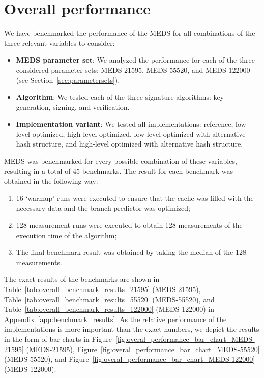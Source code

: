 \documentclass[11pt,a4paper]{report}
\theoremstyle{definition}
\begin{document}
\section{Overall performance}
\label{sec:overallperformance}
We have benchmarked the performance of the MEDS for all combinations of the three relevant variables to consider:
\begin{itemize}
  \item \textbf{MEDS parameter set}: We analyzed the performance for each of the three considered parameter sets: MEDS-21595, MEDS-55520, and MEDS-122000 (see Section~\ref{sec:parametersets}).
  \item \textbf{Algorithm}: We tested each of the three signature algorithms: key generation, signing, and verification.
  \item \textbf{Implementation variant}: We tested all implementations: reference, low-level optimized, high-level optimized, low-level optimized with alternative hash structure, and high-level optimized with alternative hash structure.
\end{itemize}
MEDS was benchmarked for every possible combination of these variables, resulting in a total of 45 benchmarks. The result for each benchmark was obtained in the following way:
\begin{enumerate}
  \item 16 `warmup' runs were executed to ensure that the cache was filled with the necessary data and the branch predictor was optimized;
  \item 128 measurement runs were executed to obtain 128 measurements of the execution time of the algorithm;
  \item The final benchmark result was obtained by taking the median of the 128 measurements.
\end{enumerate}

The exact results of the benchmarks are shown in Table~\ref{tab:overall_benchmark_results_21595} (MEDS-21595), Table~\ref{tab:overall_benchmark_results_55520} (MEDS-55520), and Table~\ref{tab:overall_benchmark_results_122000} (MEDS-122000) in Appendix~\ref{app:benchmark_results}. As the relative performance of the implementations is more important than the exact numbers, we depict the results in the form of bar charts in Figure~\ref{fig:overal_performance_bar_chart_MEDS-21595} (MEDS-21595), Figure~\ref{fig:overal_performance_bar_chart_MEDS-55520} (MEDS-55520), and Figure~\ref{fig:overal_performance_bar_chart_MEDS-122000} (MEDS-122000).
\end{document}
